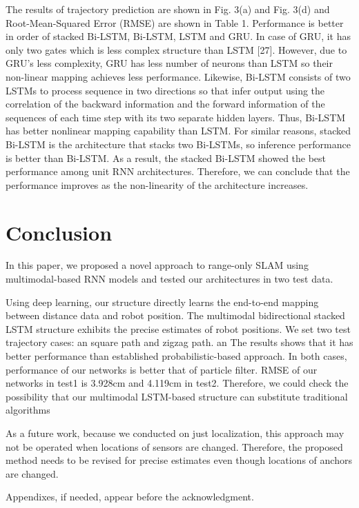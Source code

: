 \documentclass{ieeeaccess}
\begin{document}
The results of trajectory prediction are shown in Fig. 3(a) and Fig. 3(d) and
Root-Mean-Squared Error (RMSE) are shown in Table 1. Performance is better
in order of stacked Bi-LSTM, Bi-LSTM, LSTM and GRU. In case of GRU, it
has only two gates which is less complex structure than LSTM [27]. However,
due to GRU's less complexity, GRU has less number of neurons than LSTM so
their non-linear mapping achieves less performance. Likewise, Bi-LSTM consists
of two LSTMs to process sequence in two directions so that infer output using
the correlation of the backward information and the forward information of the
sequences of each time step with its two separate hidden layers. Thus, Bi-LSTM
has better nonlinear mapping capability than LSTM. For similar reasons, stacked
Bi-LSTM is the architecture that stacks two Bi-LSTMs, so inference performance
is better than Bi-LSTM. As a result, the stacked Bi-LSTM showed the best
performance among unit RNN architectures. Therefore, we can conclude that
the performance improves as the non-linearity of the architecture increases.

\section{Conclusion}

In this paper, we proposed a novel approach to range-only SLAM using multimodal-based RNN models and tested our architectures in two test data.

Using deep learning, our structure directly learns the end-to-end mapping between distance data and robot position. The multimodal bidirectional stacked LSTM structure exhibits the precise estimates of robot positions. We set two test trajectory cases: an square path and zigzag path. an The results shows that it has better performance than established probabilistic-based approach. In both cases, performance of our networks  is better that of particle filter. RMSE of our networks in test1 is 3.928cm and 4.119cm in test2. Therefore, we could check the possibility that our multimodal LSTM-based structure can substitute traditional algorithms

As a future work, because we conducted on just localization, this approach may not be operated when locations of sensors are changed. Therefore, the proposed method needs to be revised for precise estimates even though locations of anchors are changed. 

\appendices

Appendixes, if needed, appear before the acknowledgment.
\end{document}
